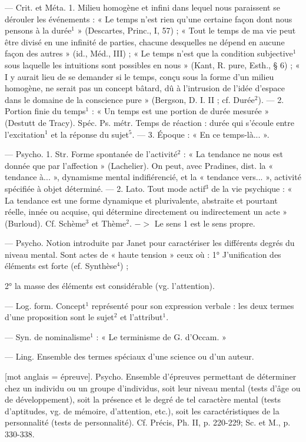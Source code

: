 \begin{itemize}[leftmargin=1cm, label=, itemsep=1pt]
 — Crit. et Méta. 1. Milieu
homogène et infini dans lequel nous
paraissent se dérouler les événements :
« Le temps n’est rien qu’une
certaine façon dont nous pensons à
la durée$^1$ » (Descartes, Princ., I, 57) ;
« Tout le temps de ma vie peut être
divisé en une infinité de parties,
chacune desquelles ne dépend en
aucune façon des autres » (id., Méd.,
III) ; « Le temps n’est que la condition subjective$^1$ sous laquelle les
intuitions sont possibles en nous »
(Kant, R. pure, Esth., § 6) ; « I y
aurait lieu de se demander si le
temps, conçu sous la forme d’un
milieu homogène, ne serait pas un
concept bâtard, dû à l’intrusion de
l’idée d'espace dans le domaine de
la conscience pure » (Bergson, D. I.
II ; cf. Durée$^2$). — 2. Portion finie
du temps$^1$ : « Un temps est une portion de durée mesurée » (Destutt
de Tracy). Spéc. Ps. métr. Temps de
réaction : durée qui s'écoule entre
l'excitation$^1$ et la réponse du sujet$^5$.
— 3. Époque : « En ce temps-là... ».

 — Psycho. 1. Str. Forme
spontanée de l’activité$^2$ : « La tendance ne nous est donnée que par
l’affection » (Lachelier). On peut,
avec Pradines, dist. la « tendance
à... », dynamisme mental indifiérencié, et la « tendance vers... »,
activité spécifiée à objet déterminé.
— 2. Lato. Tout mode actif$^3$ de la
vie psychique : « La tendance est
une forme dynamique et plurivalente, abstraite et pourtant réelle,
innée ou acquise, qui détermine
directement ou indirectement un
acte » (Burloud). Cf. Schème$^3$ et
Thème$^2$. $->$ Le sens 1 est le sens
propre.

 — Psycho.
Notion introduite par Janet pour
caractériser les différents degrés du
niveau mental. Sont actes de « haute
tension » ceux où : 1° J’unification
des éléments est forte (ef. Synthèse$^4$) ;

2° la masse des éléments est considérable (vg. l'attention).

 — Log. form. Concept$^1$ représenté pour son expression verbale :
les deux termes d’une proposition
sont le sujet$^2$ et l’attribut$^1$.

 — Syn. de nominalisme$^1$ :
« Le terminisme de G. d’Occam. »

 — Ling. Ensemble des
termes spéciaux d’une science ou
d’un auteur.

 [mot anglais = épreuve]. Psycho.
Ensemble d'épreuves permettant
de déterminer chez un individu
ou un groupe d'individus, soit
leur niveau mental (tests d'âge
ou de développement), soit la présence et le degré de tel caractère
mental (tests d’aptitudes, vg. de
mémoire, d'attention, etc.), soit les
caractéristiques de la personnalité
(tests de personnalité). Cf. Précis,
Ph. II, p. 220-229; Sc. et M., p. 330-338.


\end{itemize}
